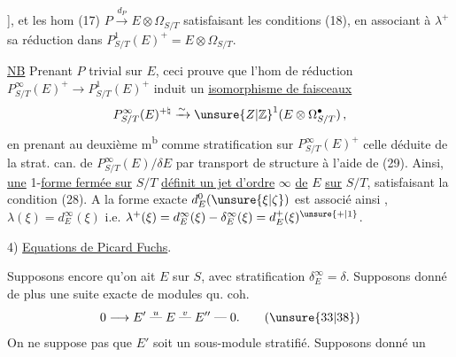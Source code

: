 ], et les hom (17) $P\xrightarrow{d_P}E\otimes\Omega_{S/T}$ satisfaisant les conditions (18), en associant à $\lambda^+$ sa réduction dans $P^1_{S/T}(E)^+=E\otimes\Omega_{S/T}$.

\uline{NB} Prenant $P$ trivial sur $E$, ceci prouve que l'hom  de réduction $P^\infty_{S/T}(E)^+\longrightarrow P^1_{S/T}(E)^+$ induit un  \uline{isomorphisme de faisceaux}
\[
 P^\infty_{S/T}(E)^{+\natural}\xrightarrow{\sim}{\unsure{Z|\mathbb Z}}^{1}(E\otimes\Omega^\bullet_{S/T})\,,
\]
en prenant au deuxième m\textsuperscript{b} comme stratification sur $P^\infty_{S/T}(E)^+$ celle déduite de la strat. can. de $P^\infty_{S/T}(E)/\delta E$ par transport de structure à l'aide de (29). Ainsi, \uline{une} 1-\uline{forme fermée sur} $S/T$  \uline{définit un jet d'ordre} $\infty$ \inserted{$\lambda^+$} \uline{de} $E$ \uline{sur} $S/T$, satisfaisant la condition (28). A la forme exacte $d^0_E(\unsure{\xi|\zeta})$ est associé ainsi  \deleted{\unsure{$\lambda^+(\xi)$}}, $\lambda(\xi)=d^\infty_E(\xi)$ i.e. $\lambda^+(\xi)=d^\infty_E(\xi)-\delta^\infty_E(\xi)=d^+_E(\xi)^{\unsure{+|1}}$.

4) \uline{Equations de Picard Fuchs}.

Supposons encore qu'on ait $E$ sur $S$, avec stratification $\delta^\infty_E=\delta$. Supposons donné de plus une suite exacte de modules qu. coh.
\[
 0\longrightarrow E'\mathrel{\overset{u}{\text{---}}}E\mathrel{\overset{v}{\text{---}}}E''\mathrel{\text{---}}0 . \tag*{(\unsure{33|38})}
\]
On ne suppose pas que $E'$ soit un sous-module stratifié.  Supposons donné un
